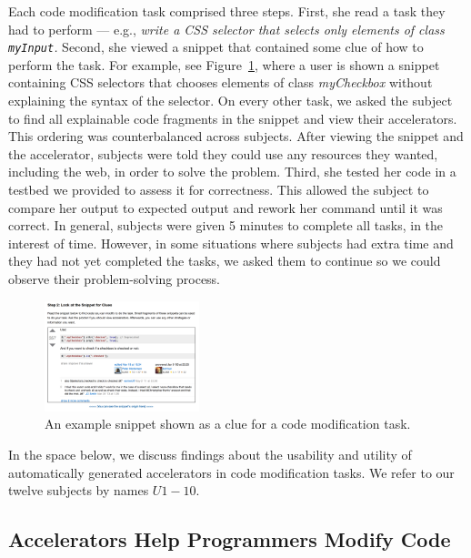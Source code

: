 Each code modification task comprised three steps.
First, she read a task they had to perform --- e.g., \emph{write a CSS selector that selects only elements of class \texttt{myInput}.}
Second, she viewed a snippet that contained some clue of how to perform the task.
For example, see Figure~\ref{fig:study_snippet}, where a user is shown a snippet containing CSS selectors that chooses elements of class \emph{myCheckbox} without explaining the syntax of the selector.
On every other task, we asked the subject to find all explainable code fragments in the snippet and view their accelerators.
This ordering was counterbalanced across subjects.
After viewing the snippet and the accelerator, subjects were told they could use any resources they wanted, including the web, in order to solve the problem.
Third, she tested her code in a testbed we provided to assess it for correctness.
This allowed the subject to compare her output to expected output and rework her command until it was correct.
In general, subjects were given 5 minutes to complete all tasks, in the interest of time.
However, in some situations where subjects had extra time and they had not yet completed the tasks, we asked them to continue so we could observe their problem-solving process.

\begin{figure}
\centering
\includegraphics[width=0.4\textwidth]{figures/study_snippet}
\caption{An example snippet shown as a clue for a code modification task.}
\label{fig:study_snippet}
\end{figure}

In the space below, we discuss findings about the usability and utility of automatically generated accelerators in code modification tasks.
We refer to our twelve subjects by names $U{1-10}$.

\subsection{Accelerators Help Programmers Modify Code}

